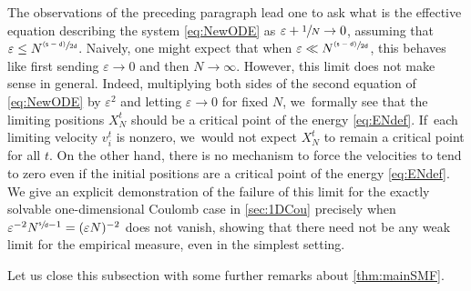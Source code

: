 \documentclass[JEP,XML,SOM,Unicode,published]{cedram}
\newcommand{\psfrac}[2]{\sfrac{(#1)}{#2}}
\theoremstyle{plain}
\theoremstyle{definition}
\let\vep\varepsilon
\let\ux X
\renewcommand{\d}{\mathsf{d}}
\newcommand{\s}{\mathsf{s}}
\begin{document}
The observations of the preceding paragraph lead one to ask what is the effective equation describing the system \eqref{eq:NewODE} as $\vep+\sfrac{1}{N}\to 0$, assuming that $\vep \leq N^{\psfrac{\s-\d}{2\d}}$. Naively, one might expect that when $\vep \ll N^{\psfrac{\s-\d}{2\d}}$, this behaves like first sending $\vep\to 0$ and then $N\to\infty$. However, this limit does not make sense in general. Indeed, multiplying both sides of the second equation of \eqref{eq:NewODE} by $\vep^2$ and letting $\vep\to 0$ for fixed $N$, we~formally see that the limiting positions $\ux_{N}^t$ should be a critical point of the energy \eqref{eq:ENdef}. If~each limiting velocity $v_{i}^t$ is nonzero, we~would not expect $\ux_{N}^t$ to remain a critical point for all $t$. On the other hand, there is no mechanism to force the velocities to tend to zero even if the initial positions are a critical point of the energy \eqref{eq:ENdef}. We give an explicit demonstration of the failure of this limit for the exactly solvable one-dimensional Coulomb case in \cref{sec:1DCou} precisely when $\vep^{-2}N^{\sfrac{\s}{\d}-1} = (\vep N)^{-2}$ does not vanish, showing that there need not be any weak limit for the empirical measure, even in the simplest setting.

Let us close this subsection with some further remarks about \cref{thm:mainSMF}.
\end{document}
